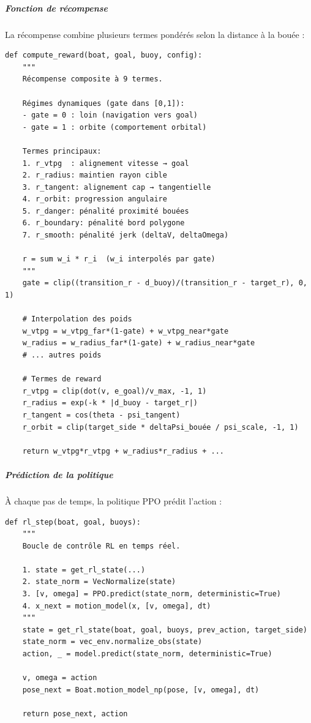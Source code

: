 \subparagraph{Fonction de récompense}

La récompense combine plusieurs termes pondérés selon la distance à la bouée :

\begin{verbatim}
def compute_reward(boat, goal, buoy, config):
    """
    Récompense composite à 9 termes.
    
    Régimes dynamiques (gate dans [0,1]):
    - gate = 0 : loin (navigation vers goal)
    - gate = 1 : orbite (comportement orbital)
    
    Termes principaux:
    1. r_vtpg  : alignement vitesse → goal
    2. r_radius: maintien rayon cible
    3. r_tangent: alignement cap → tangentielle
    4. r_orbit: progression angulaire
    5. r_danger: pénalité proximité bouées
    6. r_boundary: pénalité bord polygone
    7. r_smooth: pénalité jerk (deltaV, deltaOmega)
    
    r = sum w_i * r_i  (w_i interpolés par gate)
    """
    gate = clip((transition_r - d_buoy)/(transition_r - target_r), 0, 1)
    
    # Interpolation des poids
    w_vtpg = w_vtpg_far*(1-gate) + w_vtpg_near*gate
    w_radius = w_radius_far*(1-gate) + w_radius_near*gate
    # ... autres poids
    
    # Termes de reward
    r_vtpg = clip(dot(v, e_goal)/v_max, -1, 1)
    r_radius = exp(-k * |d_buoy - target_r|)
    r_tangent = cos(theta - psi_tangent)
    r_orbit = clip(target_side * deltaPsi_bouée / psi_scale, -1, 1)
    
    return w_vtpg*r_vtpg + w_radius*r_radius + ...
\end{verbatim}

\subparagraph{Prédiction de la politique}

À chaque pas de temps, la politique PPO prédit l'action :

\begin{verbatim}
def rl_step(boat, goal, buoys):
    """
    Boucle de contrôle RL en temps réel.
    
    1. state = get_rl_state(...)
    2. state_norm = VecNormalize(state)
    3. [v, omega] = PPO.predict(state_norm, deterministic=True)
    4. x_next = motion_model(x, [v, omega], dt)
    """
    state = get_rl_state(boat, goal, buoys, prev_action, target_side)
    state_norm = vec_env.normalize_obs(state)
    action, _ = model.predict(state_norm, deterministic=True)
    
    v, omega = action
    pose_next = Boat.motion_model_np(pose, [v, omega], dt)
    
    return pose_next, action
\end{verbatim}
